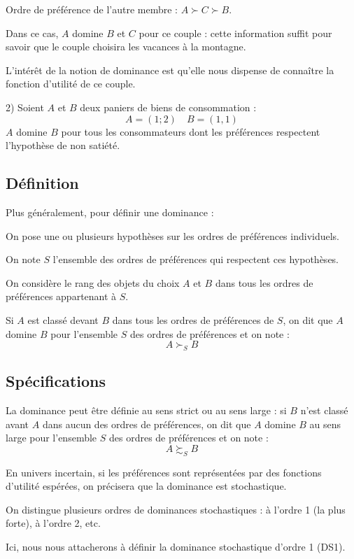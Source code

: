 \documentclass[a4paper, 12pt]{report}
\begin{document}
Ordre de préférence de l'autre membre : \( A \succ C \succ B \).

Dans ce cas, \( A \) domine \( B \) et \( C \) pour ce couple : cette information suffit pour savoir que le couple choisira les vacances à la montagne.

L'intérêt de la notion de dominance est qu'elle nous dispense de connaître la fonction d'utilité de ce couple.

2) Soient \( A \) et \( B \) deux paniers de biens de consommation :
\[ 
A = (1;2) \quad B = (1,1)
 \]
\( A \) domine \( B \) pour tous les consommateurs dont les préférences respectent l'hypothèse de non satiété.

\subsection{Définition}

Plus généralement, pour définir une dominance :

On pose une ou plusieurs hypothèses sur les ordres de préférences individuels.

On note \( S \) l'ensemble des ordres de préférences qui respectent ces hypothèses.

On considère le rang des objets du choix \( A \) et \( B \) dans tous les ordres de préférences appartenant à \( S \).

Si \( A \) est classé devant \( B \) dans tous les ordres de préférences de \( S \), on dit que \( A \) domine \( B \) pour l'ensemble \( S \) des ordres de préférences et on note :
\[
A \succ_S B
\]

\subsection{Spécifications}

La dominance peut être définie au sens strict ou au sens large : si \( B \) n'est classé avant \( A \) dans aucun des ordres de préférences, on dit que \( A \) domine \( B \) au sens large pour l'ensemble \( S \) des ordres de préférences et on note :
\[
A \succsim_S B
\]

En univers incertain, si les préférences sont représentées par des fonctions d'utilité espérées, on précisera que la dominance est stochastique.

On distingue plusieurs ordres de dominances stochastiques : à l'ordre 1 (la plus forte), à l'ordre 2, etc.

Ici, nous nous attacherons à définir la dominance stochastique d'ordre 1 (DS1).
\end{document}
